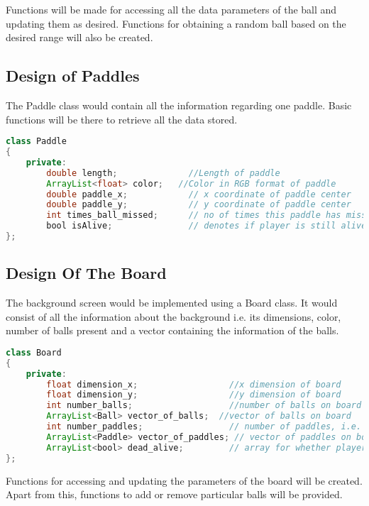 \documentclass{article}
\begin{document}
Functions will be made for accessing all the data parameters of the ball and updating them as desired. Functions for obtaining a random ball based on the desired range will also be created.

\subsection{Design of Paddles} The Paddle class would contain all the information regarding one paddle. Basic functions will be there to retrieve all the data stored.

\begin{lstlisting}[language=Java, caption={Class Parameters for Paddle}]
class Paddle
{
	private:
		double length;              //Length of paddle
		ArrayList<float> color;   //Color in RGB format of paddle
		double paddle_x;			// x coordinate of paddle center
		double paddle_y;			// y coordinate of paddle center
		int times_ball_missed;		// no of times this paddle has missed ball
		bool isAlive;				// denotes if player is still alive
};

\end{lstlisting}

\subsection{Design Of The Board} The background screen would be implemented using a Board class. It would consist of all the information about the background i.e. its dimensions, color, number of balls present and a vector containing the information of the balls.

\begin{lstlisting}[language=Java, caption={Class Parameters for Board}]
class Board
{
	private:
		float dimension_x;                  //x dimension of board
		float dimension_y;                  //y dimension of board
		int number_balls;                   //number of balls on board
		ArrayList<Ball> vector_of_balls;  //vector of balls on board
		int number_paddles;					// number of paddles, i.e. players
		ArrayList<Paddle> vector_of_paddles; // vector of paddles on board
		ArrayList<bool> dead_alive;			// array for whether player is alive/dead
};

\end{lstlisting}

Functions for accessing and updating the parameters of the board will be created. Apart from this, functions to add or remove particular balls will be provided.
\end{document}
